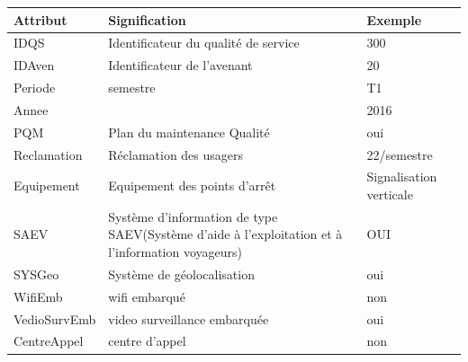 \documentclass[a4paper]{report}
\begin{document}
\begin{doublespace}
	\begin{table}[H]
		\begin{center}
			\begin{tabularx}{17.5cm}{|p{2.5cm}|X|p{3.5cm}|}
				\hline
				\textbf{Attribut}                            & \textbf{Signification}                              &
				\textbf{Exemple}                                                                                                   \\
				\hline
				IDQS                                         & Identificateur du qualité de service                & 300           \\
				\hline
				IDAven                                       & Identificateur de l'avenant                         & 20            \\
				\hline
				Periode                                      & semestre                                            & T1            \\
				\hline
				Annee                                        &                                                     & 2016          \\
				\hline
				PQM                                          & Plan du maintenance Qualité                         & oui           \\
				\hline
				Reclamation                                  & Réclamation des usagers                             & 22/semestre   \\
				\hline
				Equipement                                   & Equipement des points d'arrêt                       & Signalisation verticale                                                                     \\
				\hline
				SAEV                                         & Système d'information de type SAEV(Système d'aide à
				l'exploitation et à l'information voyageurs) & OUI                                                                 \\
				\hline
				SYSGeo                                       & Système de géolocalisation                          & oui           \\
				\hline
				WifiEmb                                      & wifi embarqué                                       & non           \\
				\hline
				VedioSurvEmb                                 & video surveillance embarquée                        & oui           \\
				\hline
				CentreAppel                                  & centre d'appel                                      & non           \\

\end{tabularx}
\end{center}
\end{table}
\end{doublespace}
\end{document}
